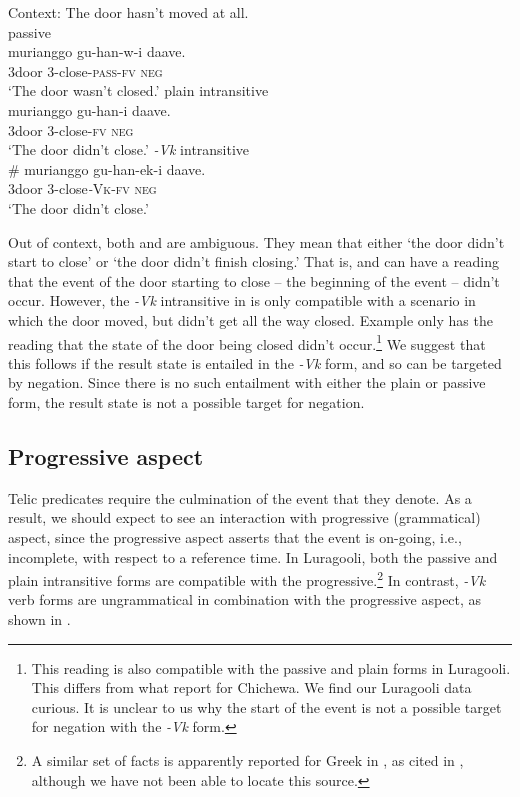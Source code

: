 \documentclass[output=paper]{langsci/langscibook}
\begin{document}
\ea\label{ex:gluckman:13} 
{Context: The door hasn’t moved at all.}\\
  \ea\label{ex:gluckman:13a}
  {{passive}}\\
  \gll   murianggo gu-han-w-i           daave.\\
	3door        3-close-\textsc{pass}-\textsc{fv}    \textsc{neg}\\
  \glt ‘The door wasn’t closed.’
  \ex\label{ex:gluckman:13b}
  {{plain intransitive}}\\
  \gll   murianggo gu-han-i     daave.\\
	3door         3-close-\textsc{fv}  \textsc{neg}\\
  \glt ‘The door didn’t close.’
  \ex\label{ex:gluckman:13c}
  { {\textit{-Vk}}{ intransitive}}\\
  \gll   \# murianggo gu-han-ek-i      daave.\\
	  {}  3door         3-close\textit{-}\textsc{Vk}-\textsc{fv}   \textsc{neg}\\
  \glt ‘The door didn’t close.’
  \z
\z

Out of context, both  and  are ambiguous. They mean that either ‘the door didn’t start to close’ or ‘the door didn’t finish closing.’ That is,  and  can have a reading that the event of the door starting to close – the beginning of the event – didn’t occur. However, the \textit{-Vk} intransitive in  is only compatible with a scenario in which the door moved, but didn’t get all the way closed. Example  only has the reading that the state of the door being closed didn’t occur.\footnote{This reading is also compatible with the passive and plain forms in Luragooli. This differs from what \citet{Dubinsky1996} report for Chichewa. We find our Luragooli data curious. It is unclear to us why the start of the event is not a possible target for negation with the \textit{-Vk} form.}  We suggest that this follows if the result state is entailed in the \textit{-Vk} form, and so can be targeted by negation. Since there is no such entailment with either the plain or passive form, the result state is not a possible target for negation.

\subsection{Progressive aspect}

Telic predicates require the culmination of the event that they denote. As a result, we should expect to see an interaction with progressive (grammatical) aspect, since the progressive aspect asserts that the event is on-going, i.e., incomplete, with respect to a reference time. In Luragooli, both the passive  and plain intransitive  forms are compatible with the progressive.\footnote{A similar set of facts is apparently reported for Greek in \citet{Mavromanolaki2002}, as cited in \citet{AlexiadouEtAl2015}, although we have not been able to locate this source.} In contrast, \textit{-Vk} verb forms are ungrammatical in combination with the progressive aspect, as shown in .
\end{document}
